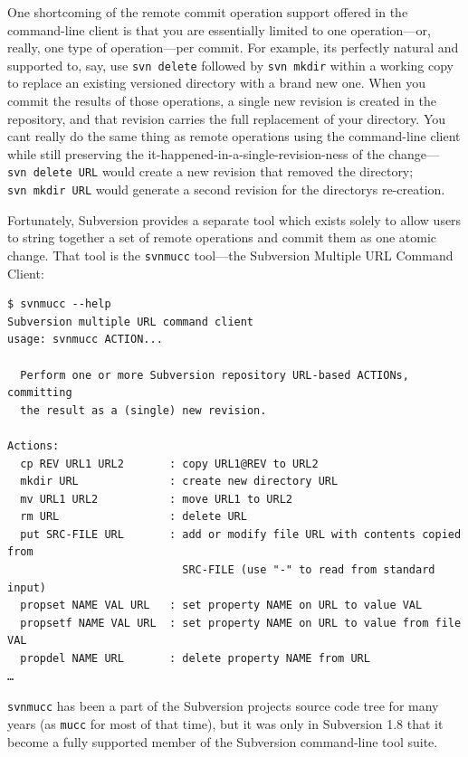 One shortcoming of the remote commit operation support offered in the
command-line client is that you are essentially limited to one
operation---or, really, one type of operation---per commit. For example,
it\textquotesingle s perfectly natural and supported to, say, use
\texttt{svn\ delete} followed by \texttt{svn\ mkdir} within a working
copy to replace an existing versioned directory with a brand new one.
When you commit the results of those operations, a single new revision
is created in the repository, and that revision carries the full
replacement of your directory. You can\textquotesingle t really do the
same thing as remote operations using the command-line client while
still preserving the it-happened-in-a-single-revision-ness of the
change---\texttt{svn\ delete\ URL} would create a new revision that
removed the directory; \texttt{svn\ mkdir\ URL} would generate a second
revision for the directory\textquotesingle s re-creation.

Fortunately, Subversion provides a separate tool which exists solely to
allow users to string together a set of remote operations and commit
them as one atomic change. That tool is the \texttt{svnmucc} tool---the
Subversion Multiple URL Command Client:

\begin{verbatim}
$ svnmucc --help
Subversion multiple URL command client
usage: svnmucc ACTION...

  Perform one or more Subversion repository URL-based ACTIONs, committing
  the result as a (single) new revision.

Actions:
  cp REV URL1 URL2       : copy URL1@REV to URL2
  mkdir URL              : create new directory URL
  mv URL1 URL2           : move URL1 to URL2
  rm URL                 : delete URL
  put SRC-FILE URL       : add or modify file URL with contents copied from
                           SRC-FILE (use "-" to read from standard input)
  propset NAME VAL URL   : set property NAME on URL to value VAL
  propsetf NAME VAL URL  : set property NAME on URL to value from file VAL
  propdel NAME URL       : delete property NAME from URL
…
\end{verbatim}

\texttt{svnmucc} has been a part of the Subversion
project\textquotesingle s source code tree for many years (as
\texttt{mucc} for most of that time), but it was only in Subversion 1.8
that it become a fully supported member of the Subversion command-line
tool suite.

